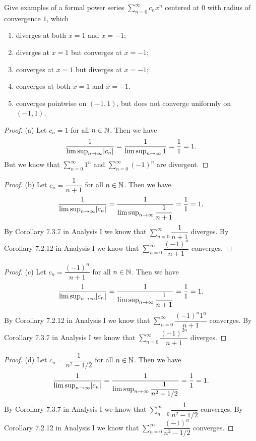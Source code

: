 \begin{ex}\label{ex:4.1.2}
  Give examples of a formal power series \(\sum_{n = 0}^\infty c_n x^n\) centered at \(0\) with radius of convergence \(1\), which
  \begin{enumerate}
    \item diverges at both \(x = 1\) and \(x = -1\);
    \item diverges at \(x = 1\) but converges at \(x = -1\);
    \item converges at \(x = 1\) but diverges at \(x = -1\);
    \item converges at both \(x = 1\) and \(x = -1\).
    \item converges pointwise on \((-1, 1)\), but does not converge uniformly on \((-1, 1)\).
  \end{enumerate}
\end{ex}

\begin{proof}{(a)}
  Let \(c_n = 1\) for all \(n \in \mathbb{N}\).
  Then we have
  \[
    \dfrac{1}{\limsup_{n \to \infty} \abs{c_n}} = \dfrac{1}{\limsup_{n \to \infty} 1} = \dfrac{1}{1} = 1.
  \]
  But we know that \(\sum_{n = 0}^\infty 1^n\) and \(\sum_{n = 0}^\infty (-1)^n\) are divergent.
\end{proof}

\begin{proof}{(b)}
  Let \(c_n = \dfrac{1}{n + 1}\) for all \(n \in \mathbb{N}\).
  Then we have
  \[
    \dfrac{1}{\limsup_{n \to \infty} \abs{c_n}} = \dfrac{1}{\limsup_{n \to \infty} \dfrac{1}{n + 1}} = \dfrac{1}{1} = 1.
  \]
  By Corollary 7.3.7 in Analysis I we know that \(\sum_{n = 0}^\infty \dfrac{1}{n + 1}\) diverges.
  By Corollary 7.2.12 in Analysis I we know that \(\sum_{n = 0}^\infty \dfrac{(-1)^n}{n + 1}\) converges.
\end{proof}

\begin{proof}{(c)}
  Let \(c_n = \dfrac{(-1)^n}{n + 1}\) for all \(n \in \mathbb{N}\).
  Then we have
  \[
    \dfrac{1}{\limsup_{n \to \infty} \abs{c_n}} = \dfrac{1}{\limsup_{n \to \infty} \dfrac{1}{n + 1}} = \dfrac{1}{1} = 1.
  \]
  By Corollary 7.2.12 in Analysis I we know that \(\sum_{n = 0}^\infty \dfrac{(-1)^n 1^n}{n + 1}\) converges.
  By Corollary 7.3.7 in Analysis I we know that \(\sum_{n = 0}^\infty \dfrac{(-1)^{2n}}{n + 1}\) diverges.
\end{proof}

\begin{proof}{(d)}
  Let \(c_n = \dfrac{1}{n^2 - 1 / 2}\) for all \(n \in \mathbb{N}\).
  Then we have
  \[
    \dfrac{1}{\limsup_{n \to \infty} \abs{c_n}} = \dfrac{1}{\limsup_{n \to \infty} \dfrac{1}{n^2 - 1 / 2}} = \dfrac{1}{1} = 1.
  \]
  By Corollary 7.3.7 in Analysis I we know that \(\sum_{n = 0}^\infty \dfrac{1}{n^2 - 1 / 2}\) converges.
  By Corollary 7.2.12 in Analysis I we know that \(\sum_{n = 0}^\infty \dfrac{(-1)^n}{n^2 - 1 / 2}\) converges.
\end{proof}

